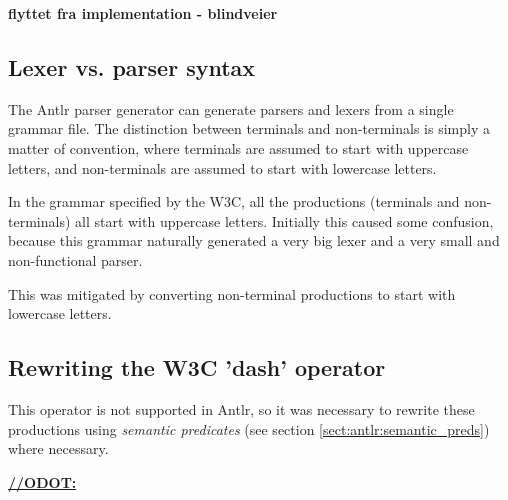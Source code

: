 \textbf{\LARGE flyttet fra implementation - blindveier}
\subsection{Lexer vs. parser syntax}
The Antlr parser generator can generate parsers and lexers from a single grammar
file. The distinction between terminals and non-terminals is simply a matter of
convention, where terminals are assumed to start with uppercase letters, and
non-terminals are assumed to start with lowercase letters.

In the grammar specified by the W3C, all the productions (terminals and
non-terminals) all start with uppercase letters. Initially this caused some
confusion, because this grammar naturally generated a very big lexer and a very
small and non-functional parser.

This was mitigated by converting non-terminal productions to start with
lowercase letters.

\subsection{Rewriting the W3C 'dash' operator}
This operator is not supported in Antlr, so it was necessary to rewrite
these productions using \emph{semantic predicates} (see section \ref{sect:antlr:semantic_preds}) where
necessary.

\underline{\textbf{\LARGE //ODOT:}}